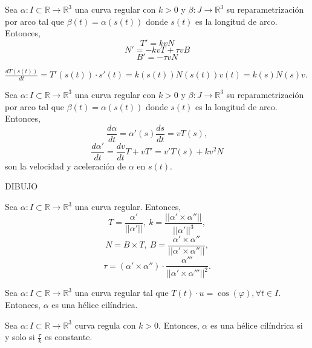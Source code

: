 \begin{prop}
  Sea $\alpha  : I \subset \mathbb{R} \to \mathbb{R}^{3}$ una curva regular con $k>0$ y $\beta: J \to \mathbb{R}^{3}$ su reparametrización por arco tal que $\beta(t) = \alpha(s(t))$ donde $s(t)$ es la longitud de arco. Entonces, 
  \[ 
    T' = kvN 
  \] 
  \[ 
    N' = -kvT + \tau v B 
  \]
  \[ 
    B' = -\tau v N 
  \]
\end{prop}

\begin{dem}
  $\frac{d{T(s(t))}}{d{t}} = T'(s(t)) \cdot s'(t) = k(s(t)) N(s(t)) v(t) = k(s) N(s) v$.
\end{dem}

\begin{prop}
  Sea $\alpha  : I \subset \mathbb{R} \to \mathbb{R}^{3}$ una curva regular con $k>0$ y $\beta: J \to \mathbb{R}^{3}$ su reparametrización por arco tal que $\beta(t) = \alpha(s(t))$ donde $s(t)$ es la longitud de arco. Entonces, 
  \[ 
    \frac{d{\alpha}}{d{t}} = \alpha'(s) \frac{d{s}}{d{t}} = v T(s),
  \] 
  \[ 
    \frac{d{\alpha'}}{d{t}} = \frac{d{v}}{d{t}}T + vT' = v'T(s) + kv^{2}N 
  \] 
  son la velocidad y aceleración de $\alpha$ en $s(t)$.
\end{prop}

DIBUJO

\begin{theo}
  Sea $\alpha  : I \subset \mathbb{R} \to \mathbb{R}^{3}$ una curva regular. Entonces,
  \[ 
    T = \frac{\alpha'}{||\alpha'||}, \ k = \frac{||\alpha' \times \alpha''||}{||\alpha'||^{3}},
  \] 
  \[ 
    N = B \times T , \ B = \frac{\alpha' \times \alpha''}{||\alpha' \times \alpha''||},
  \] 
  \[ 
    \tau = (\alpha' \times \alpha'') \cdot \frac{\alpha'''}{||\alpha' \times \alpha'''||^{2}} .
  \] 
\end{theo}

\begin{defn}
  Sea $\alpha  : I \subset \mathbb{R} \to \mathbb{R}^{3}$ una curva regular tal que $ T(t) \cdot u = \cos(\varphi), \forall t \in I$. Entonces, $\alpha$ es una hélice cilíndrica.
\end{defn}

\begin{theo}
  Sea $\alpha  : I \subset \mathbb{R} \to \mathbb{R}^{3}$ curva regula con $k>0$. Entonces, $\alpha$ es una hélice cilíndrica si y solo si $\frac{\tau}{k}$ es constante.
\end{theo}

